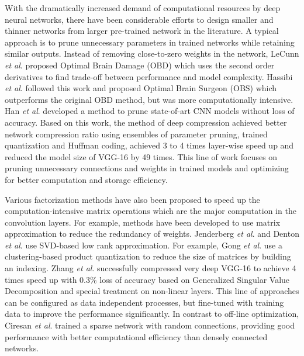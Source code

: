 \documentclass[journal]{IEEEtran}
\newcommand{\etal}{\textit{et al}. }
\begin{document}
With the dramatically increased demand of computational resources by deep neural networks, there have been considerable efforts to design smaller and thinner networks from larger pre-trained network in the literature. 
A typical approach is to prune unnecessary parameters in trained networks while retaining similar outputs. Instead of removing close-to-zero weights in the network, LeCunn \etal proposed Optimal Brain Damage (OBD) \cite{NIPS1989_250} which uses the second order derivatives to find trade-off between performance and model complexity. Hassibi \etal followed this work and proposed Optimal Brain Surgeon (OBS) \cite{hassibi1993second} which outperforms the original OBD method, but was more computationally intensive. Han \etal \cite{han2015learning} developed a method to prune state-of-art CNN models without loss of accuracy. Based on this work, the method of deep compression \cite{han2015deep} achieved better network compression ratio using ensembles of parameter pruning, trained quantization and Huffman coding, achieved 3 to 4 times layer-wise speed up and reduced the model size of VGG-16 \cite{simonyan2014very} by 49 times. This line of work focuses on pruning unnecessary connections and weights in trained models and optimizing for better computation and storage efficiency.

Various factorization methods have also been proposed to speed up the computation-intensive matrix operations which are the major computation in the convolution layers. For example,  methods have been developed to use matrix approximation to reduce the redundancy of weights. Jenderberg \etal \cite{jaderberg2014speeding} and Denton \etal \cite{denton2014exploiting} use SVD-based low rank approximation. For example, Gong \etal \cite{gong2014compressing} use a clustering-based product quantization to reduce the size of matrices by building an indexing. Zhang \etal \cite{zhang2016accelerating} successfully compressed very deep VGG-16 \cite{simonyan2014very} to achieve 4 times speed up with 0.3\% loss of accuracy based on Generalized Singular Value Decomposition and special treatment on non-linear layers. This line of approaches can be configured as data independent processes, but fine-tuned with training data to improve the performance significantly. In contrast to off-line optimization, Ciresan \etal \cite{cirecsan2011high}	trained a sparse network with random connections, providing good performance with better computational efficiency than densely connected networks.
\end{document}
